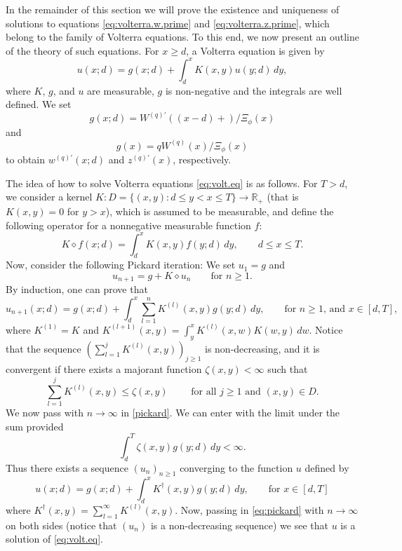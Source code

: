 \documentclass[12pt,reqno]{amsart}
\newcommand{\red}{\textcolor[rgb]{1.00,0.00,0.00}}
\newcommand{\blue}{\textcolor[rgb]{0.00,0.00,1.00}}
\theoremstyle{definition}
\theoremstyle{remark}
\newcommand{\reals}{\mathbb{R}}
\begin{document}
 In the remainder of this section we will prove the existence and uniqueness of solutions to equations \eqref{eq:volterra.w.prime} 
and \eqref{eq:volterra.z.prime}, which belong to the family of Volterra equations. To this end, we now present an outline of the theory of such equations.
For $x\geq d$, a Volterra equation is given by
  \begin{equation}\label{eq:volt.eq}u(x;d)=g(x;d)+\int_d^x K(x,y)u(y;d)\,dy,\end{equation}
  where $K$, $g$, and  $u$ are measurable, $g$ is non-negative and the integrals are well defined. We set 
	\begin{equation}\label{function_g_W}
	g(x;d)=W^{(q)\prime}((x-d)+)/\Xi_{\phi}(x)  
	\end{equation}
	 and 
	\begin{equation}\label{function_g_Z}
	g(x)=q  W^{(q)}(x)/\Xi_{\phi}(x)
	\end{equation}
	to obtain ${w^{(q)\prime}}(x;d)$
and $z^{(q)\prime}(x)$, respectively. 


The idea of how to solve Volterra {equations} \eqref{eq:volt.eq} is as follows.
For $T>d$, we {consider} a kernel $K:D=\{(x,y): d\le y < x \le T\}\to\reals_+ $
(that is $K(x,y)=0$ for $y>x$), which is assumed to be measurable, 
and define the following operator for a nonnegative measurable function $f$: 
$$K\diamond f(x;d)=\int_d^x K(x,y)f(y;d)\,dy,\qquad d\le x\le T.$$
Now, consider the following Pickard iteration: We set 
$u_1=g$  and
\begin{equation}\label{eq:pickard}
  u_{n+1}=g+K\diamond u_n\qquad \mbox{for $n\geq 1$}.\end{equation}
By induction, one can prove that
\begin{equation}\label{pickard}
u_{n+1}(x;d)=g(x;d)+\int_d^x\sum_{l=1}^nK^{(l)}(x,y)g(y;d)\,dy,\qquad\text{for $n\geq 1$, and $x\in[d,T]$,}
\end{equation}
where  $K^{(1)}=K$ and $K^{(l+1)}(x,y)=\int_y^xK^{(l)}(x,w)K(w,y)\,dw$.
 Notice that the sequence 
$\left(\sum_{l=1}^j K^{(l)}(x,y)\right)_{j\geq 1}$ is non-decreasing, and it is convergent if there exists a majorant function $\zeta(x,y)<\infty$ such that
\[\sum_{l=1}^j K^{(l)}(x,y)\le \zeta(x,y)\qquad\text{ for all $j\geq 1$ and $(x,y)\in D$}.
\]
 We now  pass with $n\to\infty$ in \eqref{pickard}. We can enter with the limit under the sum provided
\begin{equation}\label{zetaintegrable}\int_d^T\zeta(x,y)g(y;d)\,dy<\infty.
\end{equation}
Thus there exists a sequence $(u_n)_{n\geq1}$ converging to the function $u$ defined by
\begin{equation}\label{volterra}
u(x;d)=g(x;d)+\int_d^xK^{\dagger}(x,y)g(y;d)\,dy,\qquad\text{for $x\in[d,T]$}
\end{equation}
where
  $K^{\dagger}(x,y)=\sum_{l=1}^\infty K^{(l)}(x,y)$.
Now, passing in \eqref{eq:pickard} with $n\to\infty$ on both  sides
  (notice that $(u_n)$ is a non-decreasing sequence) we see that $u$ is a solution of \eqref{eq:volt.eq}.
\end{document}
